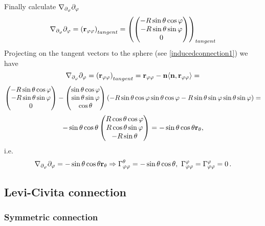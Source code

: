 \documentclass[12pt]{article}
\theoremstyle{theorem}
\numberwithin{equation}{section}
\begin{document}
Finally calculate $\nabla_{\partial_\varphi} \partial_\varphi$
                $$
            \nabla_{\partial_\varphi} \partial_\varphi=\left({\bf r}_{\varphi\varphi}\right)_{tangent}=
            \left(
            \begin{pmatrix}
            -R\sin\theta\cos\varphi\cr
            -R\sin\theta\sin\varphi\cr
            0\cr
                  \end{pmatrix}
                  \right)_{tangent}
                $$
Projecting on the tangent vectors to the sphere (see \eqref{inducedconnection1}) we have
     $$
\nabla_{\partial_\varphi} \partial_\varphi=\left({\bf r}_{\varphi\varphi}\right)_{tangent}=
{\bf r}_{\varphi\varphi}-{\bf n}\langle{\bf n},{\bf r}_{\varphi\varphi}\rangle=
         $$
         $$
     \begin{pmatrix}
            -R\sin\theta\cos\varphi\cr
            -R\sin\theta\sin\varphi\cr
            0\cr
                  \end{pmatrix}-
                  \begin{pmatrix}
            \sin\theta\cos\varphi\cr
            \sin\theta\sin\varphi\cr
            \cos\theta\cr
                  \end{pmatrix}\left(-R\sin\theta\cos\varphi\sin\theta\cos\varphi-
                  R\sin\theta\sin\varphi\sin\theta\sin\varphi\right)=
     $$
         $$
      -\sin\theta\cos\theta
      \begin{pmatrix}
            R\cos\theta\cos\varphi\cr
            R\cos\theta\sin\varphi\cr
            -R\sin\theta\cr
                  \end{pmatrix}=-\sin\theta\cos\theta{\bf r}_\theta,
         $$
i.e.
\begin{equation}\label{connectiononsphere12}
   \nabla_{\partial_\varphi}\partial_\varphi=-\sin\theta\cos\theta{\bf r}_\theta \Rightarrow
    \Gamma^\theta_{\varphi\varphi}=-\sin\theta\cos\theta,\,\,
    \Gamma^\varphi_{\varphi\varphi}=\Gamma^\varphi_{\varphi\varphi}=0\,.
\end{equation}


\subsection {Levi-Civita connection}


  \subsubsection {Symmetric connection}
\end{document}
